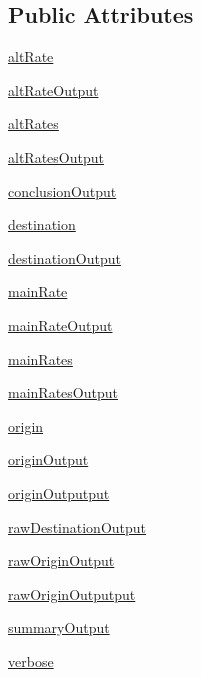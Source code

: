 \subsection*{Public Attributes}
\begin{DoxyCompactItemize}
\item 
\hyperlink{classe2e_1_1_parameters_a9d12e65d35b0807822c8774101ff613d}{alt\+Rate}
\item 
\hyperlink{classe2e_1_1_parameters_ab0fc4de0f4d6d135eea22cae77536807}{alt\+Rate\+Output}
\item 
\hyperlink{classe2e_1_1_parameters_a7f2806bfda6a689e9140610da6812dce}{alt\+Rates}
\item 
\hyperlink{classe2e_1_1_parameters_a30566bb6c78f0f438e993696b9fa9f20}{alt\+Rates\+Output}
\item 
\hyperlink{classe2e_1_1_parameters_ad5967b78ebf5c8778e423413053015a7}{conclusion\+Output}
\item 
\hyperlink{classe2e_1_1_parameters_ad2cdf746b8890c53a9cab6fd7df7043b}{destination}
\item 
\hyperlink{classe2e_1_1_parameters_a3b4ae5aa9b73466e51018b6f37792577}{destination\+Output}
\item 
\hyperlink{classe2e_1_1_parameters_a3d473f94dbb62a1488945cf6abc9f108}{main\+Rate}
\item 
\hyperlink{classe2e_1_1_parameters_acff858a94aecf1e5a553273e8acd9eca}{main\+Rate\+Output}
\item 
\hyperlink{classe2e_1_1_parameters_aaa2b41d7017ab4893bbe27fa8edb7180}{main\+Rates}
\item 
\hyperlink{classe2e_1_1_parameters_a552470d8541b7caf2bb8940e32a6fe0e}{main\+Rates\+Output}
\item 
\hyperlink{classe2e_1_1_parameters_aff4d7aaa35295f7f71e546fe5554c4d9}{origin}
\item 
\hyperlink{classe2e_1_1_parameters_ab1ac2fc0ab2f3ef169b776c776cdb225}{origin\+Output}
\item 
\hyperlink{classe2e_1_1_parameters_acece0ee5caaa6322c3a337c3b7f00599}{origin\+Outputput}
\item 
\hyperlink{classe2e_1_1_parameters_a84b319098084ed505e089a600e154f6e}{raw\+Destination\+Output}
\item 
\hyperlink{classe2e_1_1_parameters_a62b586d9863422872833e34814ac51e6}{raw\+Origin\+Output}
\item 
\hyperlink{classe2e_1_1_parameters_a363d9432d8f2bdcf645fa39b81e007f3}{raw\+Origin\+Outputput}
\item 
\hyperlink{classe2e_1_1_parameters_a1f4bab2e746d2c598e20ccba0154d795}{summary\+Output}
\item 
\hyperlink{classe2e_1_1_parameters_a84d862bf507bb0325f5daf3b7e5d9ab3}{verbose}
\end{DoxyCompactItemize}


